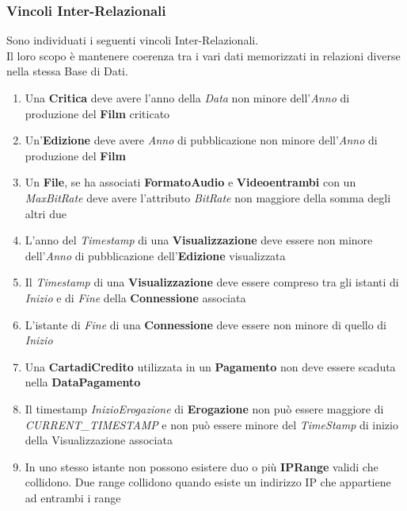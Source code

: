 \documentclass{article}
\begin{document}
\subsubsection{Vincoli Inter-Relazionali}
Sono individuati i seguenti vincoli Inter-Relazionali. \\
Il loro scopo è mantenere coerenza tra i vari dati memorizzati in relazioni diverse nella stessa Base di Dati. \\
\begin{enumerate}
\itemsep-0.25em
    \item Una \textbf{Critica} deve avere l'anno della      \textit{Data} non minore dell'\textit{Anno} di produzione del \textbf{Film} criticato
    
    \item Un'\textbf{Edizione} deve avere \textit{Anno} di pubblicazione non minore dell'\textit{Anno} di produzione del \textbf{Film}
    
    \item Un \textbf{File}, se ha associati \textbf{FormatoAudio} e \textbf{Videoentrambi} con un \textit{MaxBitRate} deve avere l'attributo \textit{BitRate} non maggiore della somma degli altri due
    
    \item L'anno del \textit{Timestamp} di una \textbf{Visualizzazione} deve essere non minore dell'\textit{Anno} di pubblicazione dell'\textbf{Edizione} visualizzata
    
    \item Il \textit{Timestamp} di una \textbf{Visualizzazione} deve essere compreso tra gli istanti di \textit{Inizio} e di \textit{Fine} della \textbf{Connessione} associata
    
    \item L'istante di \textit{Fine} di una \textbf{Connessione} deve essere non minore di quello di \textit{Inizio}
    
    \item Una \textbf{CartadiCredito} utilizzata in un \textbf{Pagamento} non deve essere scaduta nella \textbf{DataPagamento}
    
    \item Il timestamp \textit{InizioErogazione} di \textbf{Erogazione} non può essere maggiore di \textit{CURRENT\_TIMESTAMP} e non può essere minore del \textit{TimeStamp} di inizio della Visualizzazione associata
    
    \item In uno stesso istante non possono esistere duo o più \textbf{IPRange} validi che collidono. Due range collidono quando esiste un indirizzo IP che appartiene ad entrambi i range
\end{enumerate}
\end{document}
